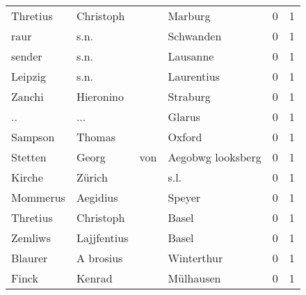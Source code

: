 \documentclass[10pt,a4paper,landscape]{article}
\begin{document}
\begin{longtable}{llllrr}
                 Thretius &                          Christoph &             &                                     Marburg &          0 &         1 \\
                     raur &                               s.n. &             &                                   Schwanden &          0 &         1 \\
                   sender &                               s.n. &             &                                    Lausanne &          0 &         1 \\
                  Leipzig &                               s.n. &             &                                  Laurentius &          0 &         1 \\
                   Zanchi &                          Hieronino &             &                                    Straburg &          0 &         1 \\
                       .. &                                ... &             &                                      Glarus &          0 &         1 \\
                  Sampson &                             Thomas &             &                                      Oxford &          0 &         1 \\
                  Stetten &                              Georg &         von &                           Aegobwg looksberg &          0 &         1 \\
                   Kirche &                             Zürich &             &                                        s.l. &          0 &         1 \\
                 Mommerus &                           Aegidius &             &                                      Speyer &          0 &         1 \\
                 Thretius &                          Christoph &             &                                       Basel &          0 &         1 \\
                  Zemliws &                        Lajjfentius &             &                                       Basel &          0 &         1 \\
                  Blaurer &                          A brosius &             &                                  Winterthur &          0 &         1 \\
                    Finck &                             Kenrad &             &                                   Mülhausen &          0 &         1 \\

\end{longtable}
\end{document}
